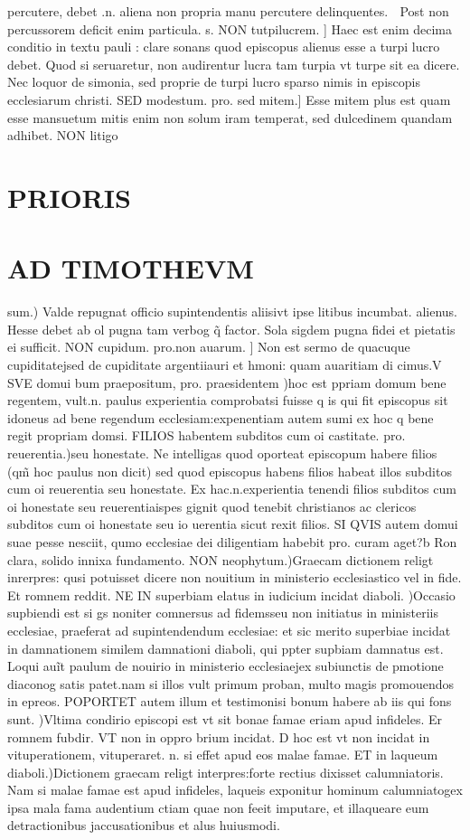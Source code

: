 \documentclass{article}
\begin{document}
\begin{pages}
percutere, debet .n. aliena non propria manu percutere delinquentes.  Post non percussorem deficit enim particula. s. NON tutpilucrem. ] Haec est enim decima conditio in textu pauli : clare sonans quod episcopus alienus esse a turpi lucro debet. Quod si seruaretur, non audirentur lucra tam turpia vt turpe sit ea dicere. Nec loquor de simonia, sed proprie de turpi lucro sparso nimis in episcopis ecclesiarum christi. SED modestum. pro. sed mitem.] Esse mitem plus est quam esse mansuetum mitis enim non solum iram temperat, sed dulcedinem quandam adhibet. NON litigo\pend
\section*{PRIORIS }
\section*{AD TIMOTHEVM }\pstart sum.) Valde repugnat officio supintendentis aliisivt ipse litibus incumbat. alienus. Hesse debet ab ol pugna tam verbog q̃ factor. Sola sigdem pugna fidei et pietatis ei sufficit. NON cupidum. pro.non auarum. ] Non est sermo de quacuque cupiditatejsed de cupiditate argentiiauri et hmoni: quam auaritiam di cimus.V SVE domui bum praepositum, pro. praesidentem )hoc est ppriam domum bene regentem, vult.n. paulus experientia comprobatsi fuisse q is qui fit episcopus sit idoneus ad bene regendum ecclesiam:expenentiam autem sumi ex hoc q bene regit propriam domsi. FILIOS habentem subditos cum oi castitate. pro. reuerentia.)seu honestate. Ne intelligas quod oporteat episcopum habere filios (qm̃ hoc paulus non dicit) sed quod episcopus habens filios habeat illos subditos cum oi reuerentia seu honestate. Ex hac.n.experientia tenendi filios subditos cum oi honestate seu reuerentiaispes gignit quod tenebit christianos ac clericos subditos cum oi honestate seu io uerentia sicut rexit filios. SI QVIS autem domui suae pesse nesciit, qumo ecclesiae dei diligentiam habebit pro. curam aget?b Ron clara, solido innixa fundamento. NON neophytum.)Graecam dictionem religt inrerpres: qusi potuisset dicere non nouitium in ministerio ecclesiastico vel in fide. Et romnem reddit. NE IN superbiam elatus in iudicium incidat diaboli. )Occasio supbiendi est si gs noniter comnersus ad fidemsseu non initiatus in ministeriis ecclesiae, praeferat ad supintendendum ecclesiae: et sic merito superbiae incidat in damnationem similem damnationi diaboli, qui ppter supbiam damnatus est. Loqui auĩt paulum de nouirio in ministerio ecclesiaejex subiunctis de pmotione diaconog satis patet.nam si illos vult primum proban, multo magis promouendos in epreos. POPORTET autem illum et testimonisi bonum habere ab iis qui fons sunt. )Vltima condirio episcopi est vt sit bonae famae eriam apud infideles. Er romnem fubdir. VT non in oppro brium incidat. D hoc est vt non incidat in vituperationem, vituperaret. n. si effet apud eos malae famae. ET in laqueum diaboli.)Dictionem graecam religt interpres:forte rectius dixisset calumniatoris. Nam si malae famae est apud infideles, laqueis exponitur hominum calumniatogex ipsa mala fama audentium ctiam quae non feeit imputare, et illaqueare eum detractionibus jaccusationibus et alus huiusmodi.  
\end{pages}
\end{document}
